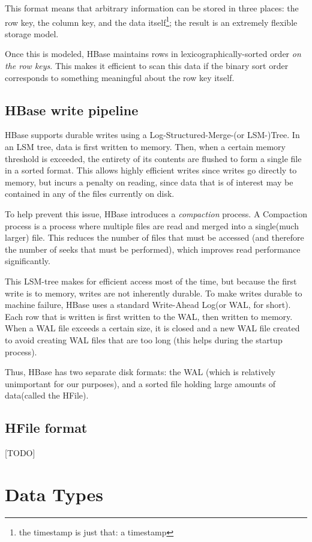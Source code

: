 This format means that arbitrary information can be stored in three places: the row key, the column key, and the data itself\footnote{the timestamp is just that: a timestamp}; the result is an extremely flexible storage model.

Once this is modeled, HBase maintains rows in lexicographically-sorted order \emph{on the row keys}. This makes it efficient to scan this data if the binary sort order corresponds to something meaningful about the row key itself.

\subsection{HBase write pipeline}
HBase supports durable writes using a Log-Structured-Merge-(or LSM-)Tree. In an LSM tree, data is first written to memory. Then, when a certain memory threshold is exceeded, the entirety of its contents are flushed to form a single file in a sorted format. This allows highly efficient writes since writes go directly to memory, but incurs a penalty on reading, since data that is of interest may be contained in any of the files currently on disk.

To help prevent this issue, HBase introduces a \emph{compaction} process. A Compaction process is a process where multiple files are read and merged into a single(much larger) file. This reduces the number of files that must be accessed (and therefore the number of seeks that must be performed), which improves read performance significantly. 

This LSM-tree makes for efficient access most of the time, but because the first write is to memory, writes are not inherently durable. To make writes durable to machine failure, HBase uses a standard Write-Ahead Log(or WAL, for short). Each row that is written is first written to the WAL, then written to memory. When a WAL file exceeds a certain size, it is closed and a new WAL file created to avoid creating WAL files that are too long (this helps during the startup process).

Thus, HBase has two separate disk formats: the WAL (which is relatively unimportant for our purposes), and a sorted file holding large amounts of data(called the HFile).  

\subsection{HFile format}
[TODO]

\section{Data Types}

